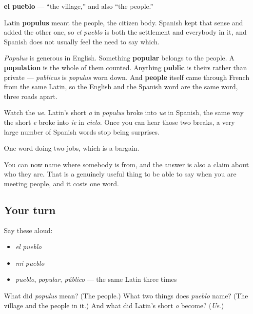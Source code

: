 \begin{cousinweb}
\textbf{el pueblo} — \textquotedblleft{}the village,\textquotedblright{} and also \textquotedblleft{}the people.\textquotedblright{}

Latin \textbf{populus} meant the people, the citizen body. Spanish kept that sense and added the other one, so \emph{el pueblo} is both the settlement and everybody in it, and Spanish does not usually feel the need to say which.

\emph{Populus} is generous in English. Something \textbf{popular} belongs to the people. A \textbf{population} is the whole of them counted. Anything \textbf{public} is theirs rather than private — \emph{publicus} is \emph{populus} worn down. And \textbf{people} itself came through French from the same Latin, so the English and the Spanish word are the same word, three roads apart.

Watch the \emph{ue}. Latin's short \emph{o} in \emph{populus} broke into \emph{ue} in Spanish, the same way the short \emph{e} broke into \emph{ie} in \emph{cielo}. Once you can hear those two breaks, a very large number of Spanish words stop being surprises.
\end{cousinweb}

\begin{grammarlens}[title={What you've built}]
One word doing two jobs, which is a bargain.

You can now name where somebody is from, and the answer is also a claim about who they are. That is a genuinely useful thing to be able to say when you are meeting people, and it costs one word.
\end{grammarlens}

\subsection*{Your turn}
Say these aloud:

\begin{itemize}
\raggedright
  \item \emph{el pueblo}
  \item \emph{mi pueblo}
  \item \emph{pueblo}, \emph{popular}, \emph{público} — the same Latin three times
\end{itemize}

\begin{tcolorbox}[breakable,colback=teal!4,colframe=teal!35!black,title={Before you move on}]
What did \emph{populus} mean? (The people.) What two things does \emph{pueblo} name? (The village and the people in it.) And what did Latin's short \emph{o} become? (\emph{Ue}.)
\end{tcolorbox}
